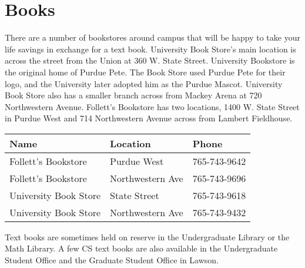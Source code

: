 \section{Books}

There are a number of bookstores around campus that will be happy to take your life savings in exchange for a text book. University Book Store's main location is across the street from the Union at 360 W. State Street. University Bookstore is the original home of Purdue Pete. The Book Store used Purdue Pete for their logo, and the University later adopted him as the Purdue Mascot. University Book Store also has a smaller branch across from Mackey Arena at 720 Northwestern Avenue. Follett's Bookstore has two locations, 1400 W. State Street in Purdue West and 714 Northwestern Avenue across from Lambert Fieldhouse.

\begin{table}[H]
	\centering
	\begin{tabular}{@{}lll@{}}
		\toprule
		\textbf{Name} & \textbf{Location} & \textbf{Phone} \\
		\midrule
		Follett's Bookstore & Purdue West & 765-743-9642 \\
		Follett's Bookstore & Northwestern Ave & 765-743-9696 \\
		University Book Store & State Street & 765-743-9618 \\
		University Book Store & Northwestern Ave & 765-743-9432 \\
		\bottomrule
	\end{tabular}
\end{table}

Text books are sometimes held on reserve in the Undergraduate Library or the Math Library. A few CS text books are also available in the Undergraduate Student Office and the Graduate Student Office in Lawson.

